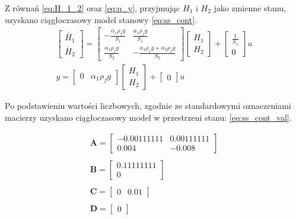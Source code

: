 \documentclass{article}
\begin{document}
Z równań \ref{eq:H_1_2} oraz \ref{eq:q_y}, przyjmując $H_1$ i $H_2$ jako zmienne stanu, uzyskano ciągłoczasowy model stanowy \ref{eq:ss_cont}.
\begin{equation}\label{eq:ss_cont}
 \begin{array}{l}
 
 \begin{bmatrix} \dot{H_1} \\ \dot{H_2} \end{bmatrix}  = 
 \begin{bmatrix} -\frac{\alpha_1 \rho_f g}{S_1} & \frac{\alpha_1 \rho_f g}{S_1}\\ 
  \frac{\alpha_1 \rho_f g}{S_2} & -\frac{\alpha_1 \rho_f g + \alpha_2 \rho_f g}{S_2} 
 \end{bmatrix}   \begin{bmatrix} H_1 \\ H_2 \end{bmatrix} + 
 \begin{bmatrix}\frac{1}{S_1} \\ 0\end{bmatrix}u  \\
 
 y  = \begin{bmatrix} 0 & \alpha_1 \rho_f g \end{bmatrix}
 \begin{bmatrix} H_1 \\ H_2 \end{bmatrix} + 
 \begin{bmatrix} 0 \end{bmatrix} u
 
 \end{array}
\end{equation}

Po podstawieniu wartości liczbowych, zgodnie ze standardowymi oznaczeniami macierzy uzyskano ciągłoczasowy model w przestrzeni stanu: \ref{eq:ss_cont_val}.

\begin{equation}\label{eq:ss_cont_val}
 \begin{array}{l}
  \mathbf{A} = \begin{bmatrix}  -0.00111111 &  0.00111111 \\
  							    0.004      & -0.008    
  			   \end{bmatrix} \\ \\
  \mathbf{B} = \begin{bmatrix} 0.11111111 \\ 0 \end{bmatrix} \\ \\
  \mathbf{C} = \begin{bmatrix} 0 & 0.01 \end{bmatrix} \\ \\
  \mathbf{D} = \begin{bmatrix} 0 \end{bmatrix} \\
\end{array}
\end{equation}
\end{document}
